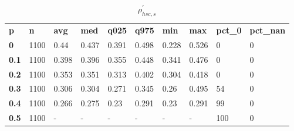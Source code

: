 \begin{table}[h]
 \centering 
\footnotesize
\caption{$\rho_{hsc,s}^\prime $}
\label{tab:alphahscs}
\begin{tabular}[h]{| l l l l l l l l l l|
    } \hline
\textbf{ p} & \textbf{ n} & \textbf{ avg} & \textbf{ med} & \textbf{ q025} & \textbf{ q975} & \textbf{ min} & \textbf{ max} & \textbf{ pct\_0} & \textbf{ pct\_nan}
           \\
  \textbf{  0} & 1100 &  0.44 & 0.437 & 0.391 & 0.498 & 0.228 & 0.526 &   0 & 0
           \\
  \textbf{0.1} & 1100 & 0.398 & 0.396 & 0.355 & 0.448 & 0.341 & 0.476 &   0 & 0
           \\
  \textbf{0.2} & 1100 & 0.353 & 0.351 & 0.313 & 0.402 & 0.304 & 0.418 &   0 & 0
           \\
  \textbf{0.3} & 1100 & 0.306 & 0.304 & 0.271 & 0.345 &  0.26 & 0.495 &  54 & 0
           \\
  \textbf{0.4} & 1100 & 0.266 & 0.275 &  0.23 & 0.291 &  0.23 & 0.291 &  99 & 0
           \\
  \textbf{0.5} & 1100 & - & - & - & - & - & - & 100 & 0
           \\
 \hline \end{tabular}
 \end{table}
